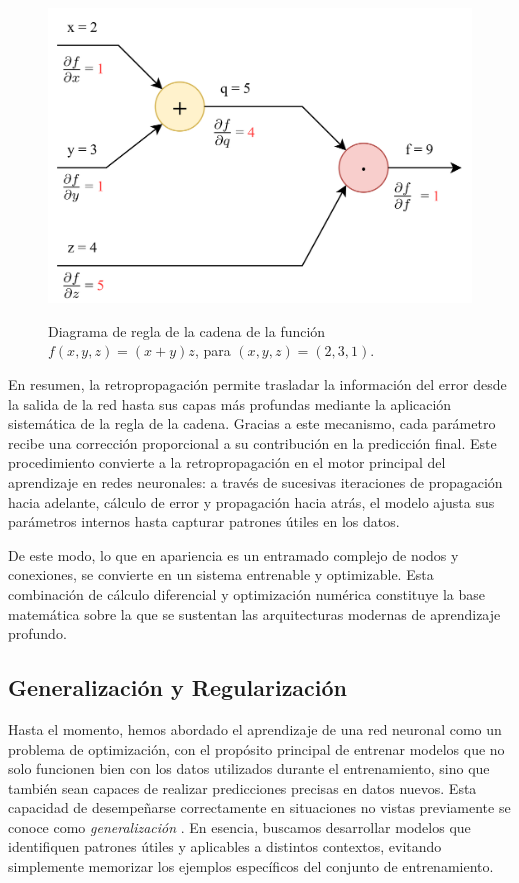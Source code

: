 \begin{figure}[h!]
	\centering
	\includegraphics[width=0.6\linewidth]{figures/ejemplos/backward_diagram.png}
	\label{fig:backward_diagrama}
	\caption{Diagrama de regla de la cadena de la función $f(x,y,z)=(x+y)z$, para $(x,y,z)=(2,3,1)$.}
\end{figure}

En resumen, la retropropagación permite trasladar la información del error desde la salida de la red hasta sus capas más profundas mediante la aplicación sistemática de la regla de la cadena. Gracias a este mecanismo, cada parámetro recibe una corrección proporcional a su contribución en la predicción final. Este procedimiento convierte a la retropropagación en el motor principal del aprendizaje en redes neuronales: a través de sucesivas iteraciones de propagación hacia adelante, cálculo de error y propagación hacia atrás, el modelo ajusta sus parámetros internos hasta capturar patrones útiles en los datos.

De este modo, lo que en apariencia es un entramado complejo de nodos y conexiones, se convierte en un sistema entrenable y optimizable. Esta combinación de cálculo diferencial y optimización numérica constituye la base matemática sobre la que se sustentan las arquitecturas modernas de aprendizaje profundo.


\subsection{Generalización y Regularización}

Hasta el momento, hemos abordado el aprendizaje de una red neuronal como un problema de optimización, con el propósito principal de entrenar modelos que no solo funcionen bien con los datos utilizados durante el entrenamiento, sino que también sean capaces de realizar predicciones precisas en datos nuevos. Esta capacidad de desempeñarse correctamente en situaciones no vistas previamente se conoce como \textit{generalización} \cite{dl__goodfellow_2016}. En esencia, buscamos desarrollar modelos que identifiquen patrones útiles y aplicables a distintos contextos, evitando simplemente memorizar los ejemplos específicos del conjunto de entrenamiento.

